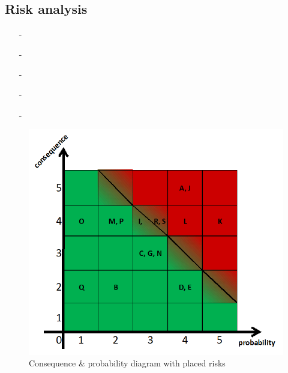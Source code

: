 \subsection{Risk analysis}
\label{risk}


\begin{itemize}
\item[-] 
\item[-] 
\item[-] 
\item[-] 
\item[-] 
\end{itemize}

\begin{figure}[h!]
\centering
\label{cxp}
\includegraphics[scale=0.4]{./graphics/cxp}
\caption{Consequence \& probability diagram with placed risks}
\end{figure}

